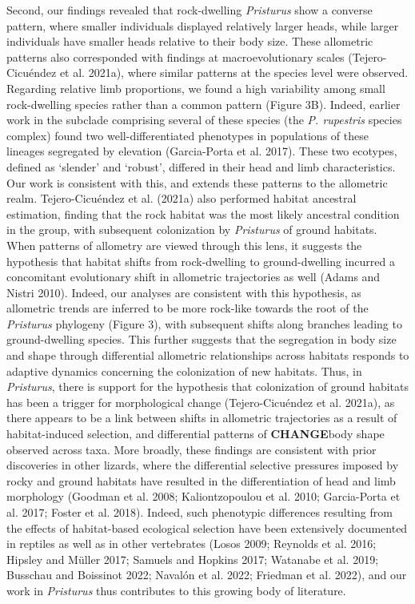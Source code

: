 \documentclass[
  11pt,
]{article}
\begin{document}
Second, our findings revealed that rock-dwelling \emph{Pristurus} show a
converse pattern, where smaller individuals displayed relatively larger
heads, while larger individuals have smaller heads relative to their
body size. These allometric patterns also corresponded with findings at
macroevolutionary scales (Tejero-Cicuéndez et al. 2021a), where similar
patterns at the species level were observed. Regarding relative limb
proportions, we found a high variability among small rock-dwelling
species rather than a common pattern (Figure 3B). Indeed, earlier work
in the subclade comprising several of these species (the \emph{P.
rupestris} species complex) found two well-differentiated phenotypes in
populations of these lineages segregated by elevation (Garcia-Porta et
al. 2017). These two ecotypes, defined as `slender' and `robust',
differed in their head and limb characteristics. Our work is consistent
with this, and extends these patterns to the allometric realm.
Tejero-Cicuéndez et al. (2021a) also performed habitat ancestral
estimation, finding that the rock habitat was the most likely ancestral
condition in the group, with subsequent colonization by \emph{Pristurus}
of ground habitats. When patterns of allometry are viewed through this
lens, it suggests the hypothesis that habitat shifts from rock-dwelling
to ground-dwelling incurred a concomitant evolutionary shift in
allometric trajectories as well (Adams and Nistri 2010). Indeed, our
analyses are consistent with this hypothesis, as allometric trends are
inferred to be more rock-like towards the root of the \emph{Pristurus}
phylogeny (Figure 3), with subsequent shifts along branches leading to
ground-dwelling species. This further suggests that the segregation in
body size and shape through differential allometric relationships across
habitats responds to adaptive dynamics concerning the colonization of
new habitats. Thus, in \emph{Pristurus}, there is support for the
hypothesis that colonization of ground habitats has been a trigger for
morphological change (Tejero-Cicuéndez et al. 2021a), as there appears
to be a link between shifts in allometric trajectories as a result of
habitat-induced selection, and differential patterns of
\textbf{CHANGE}body shape observed across taxa. More broadly, these
findings are consistent with prior discoveries in other lizards, where
the differential selective pressures imposed by rocky and ground
habitats have resulted in the differentiation of head and limb
morphology (Goodman et al. 2008; Kaliontzopoulou et al. 2010;
Garcia-Porta et al. 2017; Foster et al. 2018). Indeed, such phenotypic
differences resulting from the effects of habitat-based ecological
selection have been extensively documented in reptiles as well as in
other vertebrates (Losos 2009; Reynolds et al. 2016; Hipsley and Müller
2017; Samuels and Hopkins 2017; Watanabe et al. 2019; Busschau and
Boissinot 2022; Navalón et al. 2022; Friedman et al. 2022), and our work
in \emph{Pristurus} thus contributes to this growing body of literature.
\hfill\break
\end{document}
